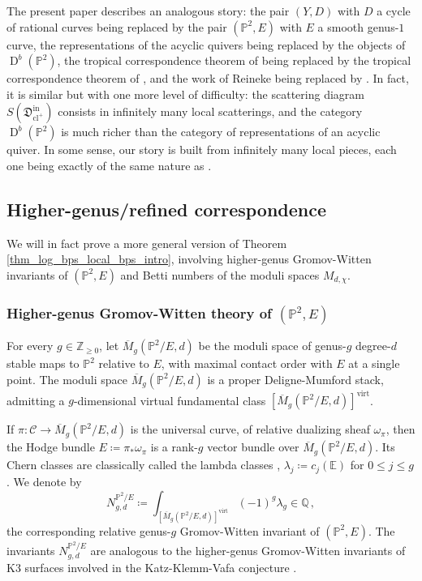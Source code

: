 \documentclass[11pt,letterpaper]{amsart}
\newcommand\E{\mathbb E}
\newcommand\PP{\mathbb P}
\newcommand\Q{\mathbb Q}
\newcommand\Z{\mathbb Z}
\newcommand\cC{\mathcal C}
\newcommand\fD{\mathfrak D}
\newcommand\cl{\operatorname{cl}}
\newcommand\D{\operatorname{D}}
\newcommand\virt{\mathrm{virt}}
\newcommand\iin{\mathrm{in}}
\begin{document}
The present paper describes an analogous story: the pair 
$(Y,D)$ with $D$ a cycle of rational curves being replaced by the pair 
$(\PP^2,E)$ with $E$ a smooth genus-$1$ curve, 
the representations of the acyclic quivers being replaced by the objects of
$\D^b(\PP^2)$, the tropical correspondence theorem of \cite{MR2667135} 
being replaced by the tropical correspondence theorem of 
\cite{gabele2019tropical}, and the work of Reineke \cite{MR2801406, MR2650811} being replaced by 
\cite{bousseau2019scattering}. In fact, it is similar but with one more level of 
difficulty:
the scattering diagram $S(\fD^\iin_{\cl^+})$ 
consists in infinitely many local scatterings, 
and the category $\D^b(\PP^2)$ is much richer 
than the category of representations of an acyclic quiver. 
In some sense, our story is built from infinitely many local pieces, 
each one being exactly of the same nature as 
\cite{MR2667135, MR2662867}.



\subsection{Higher-genus/refined correspondence}

We will in fact prove a more general version of Theorem \ref{thm_log_bps_local_bps_intro}, involving higher-genus Gromov-Witten invariants of $(\PP^2,E)$ and Betti numbers of the moduli spaces $M_{d,\chi}$.


\subsubsection{Higher-genus Gromov-Witten theory of $(\PP^2,E)$}
\label{section_higher_genus_intro}
For every $g \in \Z_{\geq 0}$, let
$\overline{M}_{g}(\PP^2/E,d)$ be the moduli space of 
genus-$g$ degree-$d$ stable maps to $\PP^2$ relative to $E$,
with maximal contact order with $E$ at a single point.
The moduli space $\overline{M}_{g}(\PP^2/E,d)$ is a proper Deligne-Mumford stack, admitting a $g$-dimensional
virtual fundamental class
$[\overline{M}_{g}(\PP^2/E,d)]^{\virt}$.

If $\pi \colon \cC \rightarrow 
\overline{M}_{g}(\PP^2/E,d)$ is the universal curve,
of relative dualizing sheaf 
$\omega_\pi$, then the Hodge bundle
$E\coloneqq \pi_{*}\omega_\pi$
is a rank-$g$ vector bundle over 
$\overline{M}_{g}(\PP^2/E,d)$. Its Chern classes 
are classically called the lambda classes
\cite{MR717614},
$\lambda_j \coloneqq c_j(\E)$
for $0 \leqslant j \leqslant g$.
We denote by
\[N_{g,d}^{\PP^2/E} \coloneq \int_{[\overline{M}_{g}(\PP^2/E,d)]^{\virt}} (-1)^g \lambda_g \in \Q \,,\]
the corresponding relative genus-$g$ Gromov-Witten invariant of $(\PP^2,E)$.
The invariants 
$N_{g,d}^{\PP^2/E}$ are analogous to the higher-genus Gromov-Witten invariants of K3 surfaces involved in the Katz-Klemm-Vafa conjecture \cite{MR2746343}.
\end{document}
